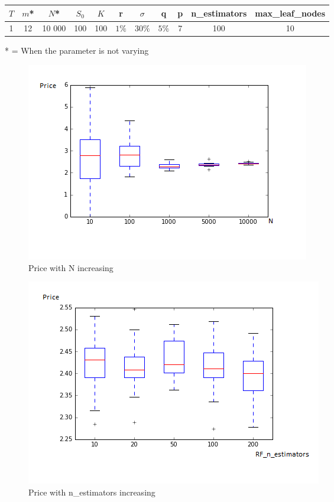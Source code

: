 \documentclass[english,11pt,openany]{article}
\begin{document}
\begin{tabular}{c|c|c|c|c|c|c|c|c|c|c}
	   $T$ & $m$* & $N$* & $S_0$  & $K$ & r& $\sigma$ & q & p & n\_estimators & max\_leaf\_nodes\\
	\hline
	              1  & 12 & 10 000 & 100  & 100 &  $1\%$ & $30\% $ & $5\%$ & 7 & 100 & 10
\end{tabular}
\vspace{1cm}

* = When the parameter is not varying

	\begin{figure}[h]
		\includegraphics[scale=0.8]{Rforest_p_assets_n_varying.png}
		\caption{Price with N increasing}
	\end{figure} \hfill
	
	
	\begin{figure}[h]
		\includegraphics[scale=0.8]{Rforest_p_assets_rfestimators_varying.png}
		\caption{Price with n\_estimators increasing}
	\end{figure}
	
\end{document}
